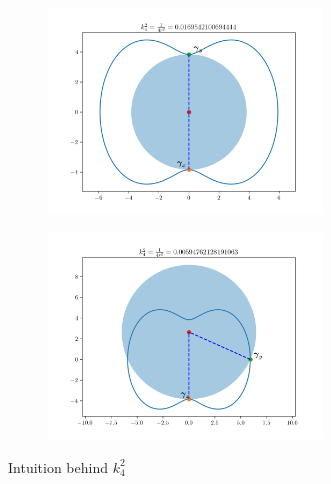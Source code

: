 \documentclass[../dissertation.tex]{subfiles}
\begin{document}
\begin{figure}[tbp]
    \centering
    \begin{subfigure}[b]{\textwidth}
        \centering
        \includegraphics[width=0.8\textwidth]{sections/tangentPointEnergyImgs/straight}
    \end{subfigure}
    \par \bigskip
    \begin{subfigure}[b]{1\textwidth}
        \centering
        \includegraphics[width=0.8\textwidth]{sections/tangentPointEnergyImgs/0}
    \end{subfigure}
    \caption{Intuition behind $k_{4}^{2}$}
    \label{Fig: Intuition of Buck-Orloff}
\end{figure}
\end{document}
